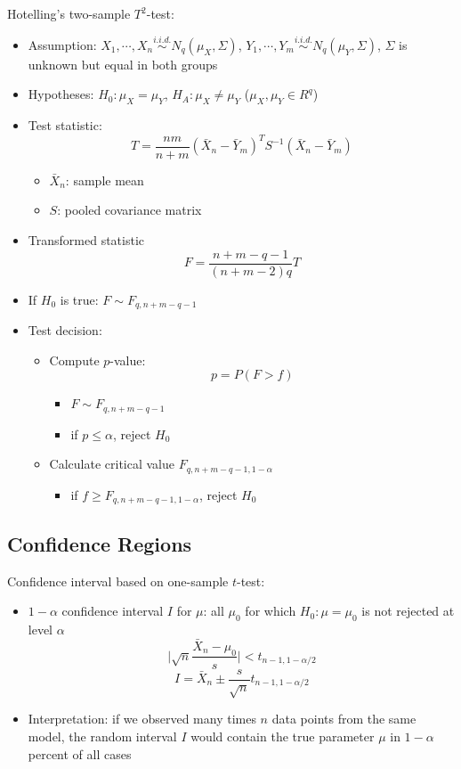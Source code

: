 \documentclass[a4paper]{article}
\begin{document}
Hotelling's two-sample $T^2$-test:
\begin{itemize}
    \item Assumption: $X_1,\cdots,X_n\overset{i.i.d.}{\sim}N_q(\mu_X,\Sigma)$, $Y_1,\cdots,Y_m\overset{i.i.d.}{\sim}N_q(\mu_Y,\Sigma)$, $\Sigma$ is unknown but equal in both groups
    \item Hypotheses: $H_0:\mu_X=\mu_Y$, $H_A:\mu_X\neq\mu_Y$ ($\mu_X,\mu_Y\in R^q$)
    \item Test statistic:
    \[T=\frac{nm}{n+m}(\bar{X}_n-\bar{Y}_m)^{T}S^{-1}(\bar{X}_n-\bar{Y}_m) \]
    \begin{itemize}
        \item $\bar{X}_n$: sample mean
        \item $S$: pooled covariance matrix
    \end{itemize}
    \item Transformed statistic 
    \[F=\frac{n+m-q-1}{(n+m-2)q}T \]
    \item If $H_0$ is true: $F\sim F_{q,n+m-q-1}$
    \item Test decision:
    \begin{itemize}
        \item Compute $p$-value:
        \[p=P(F>f) \]
        \begin{itemize}
            \item $F\sim F_{q, n+m-q-1}$
            \item if $p\leq \alpha$, reject $H_0$
        \end{itemize}
        \item Calculate critical value $F_{q,n+m-q-1,1-\alpha}$
        \begin{itemize}
            \item if $f\geq F_{q,n+m-q-1,1-\alpha}$, reject $H_0$
        \end{itemize}
    \end{itemize}
\end{itemize}

\subsection{Confidence Regions}

Confidence interval based on one-sample $t$-test:
\begin{itemize}
    \item $1-\alpha$ confidence interval $I$ for $\mu$: all $\mu_0$ for which $H_0:\mu=\mu_0$ is not rejected at level $\alpha$
    \[\Big\lvert\sqrt{n}\frac{\bar{X}_n-\mu_0}{s} \Big\rvert<t_{n-1,1-\alpha/2} \]
    \[I=\bar{X}_n\pm\frac{s}{\sqrt{n}}t_{n-1,1-\alpha/2} \]
    \item Interpretation: if we observed many times $n$ data points from the same model, the random interval $I$ would contain the true parameter $\mu$ in $1-\alpha$ percent of all cases
\end{itemize}
\end{document}
